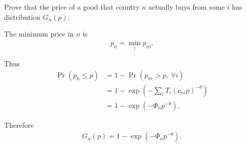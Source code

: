 
Prove that the price of a good that country $n$ actually buys from some $i$ has distribution $G_n(p)$.


\begin{solution}
The minimum price in $n$ is
\begin{align*}
p_n = \min_i p_{ni}.
\end{align*}

Thus
\begin{align*}
\Pr(p_n \leq p) 
&= 1 - \Pr(p_{ni} > p, \ \forall i) \\
&= 1 - \exp\!\left(-\sum_i T_i (c_{ni} p)^{-\theta}\right) \\
&= 1 - \exp(-\Phi_n p^{-\theta}).
\end{align*}

Therefore
\begin{align*}
G_n(p) = 1 - \exp(-\Phi_n p^{-\theta}).
\end{align*}
\end{solution}

